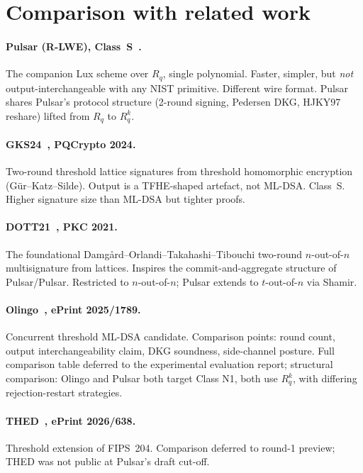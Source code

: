 \documentclass[11pt,a4paper]{article}
\theoremstyle{definition}
\theoremstyle{remark}
\newcommand{\Rq}{R_q}
\begin{document}
\section{Comparison with related work}
\label{sec:related}

\paragraph{Pulsar (R-LWE), Class~S~\cite{boschini2024ringtail}.}
The companion Lux scheme over $\Rq$, single polynomial. Faster,
simpler, but \emph{not} output-interchangeable with any NIST primitive.
Different wire format. Pulsar shares Pulsar's protocol structure
(2-round signing, Pedersen DKG, HJKY97 reshare) lifted from $\Rq$ to
$\Rq^k$.

\paragraph{GKS24~\cite{gks24}, PQCrypto 2024.}
Two-round threshold lattice signatures from threshold homomorphic
encryption (G\"ur--Katz--Silde). Output is a TFHE-shaped artefact, not
ML-DSA. Class~S. Higher signature size than ML-DSA but tighter
proofs.

\paragraph{DOTT21~\cite{dott21}, PKC 2021.}
The foundational Damg\aa rd--Orlandi--Takahashi--Tibouchi two-round
$n$-out-of-$n$ multisignature from lattices. Inspires the
commit-and-aggregate structure of Pulsar/Pulsar. Restricted to
$n$-out-of-$n$; Pulsar extends to $t$-out-of-$n$ via Shamir.

\paragraph{Olingo~\cite{olingo2025}, ePrint 2025/1789.}
Concurrent threshold ML-DSA candidate. Comparison points: round
count, output interchangeability claim, DKG soundness, side-channel
posture. Full comparison table deferred to the experimental
evaluation report; structural comparison: Olingo and Pulsar both
target Class N1, both use $\Rq^k$, with differing rejection-restart
strategies.

\paragraph{THED~\cite{thed2026}, ePrint 2026/638.}
Threshold extension of FIPS~204. Comparison deferred to round-1
preview; THED was not public at Pulsar's draft cut-off.
\end{document}
